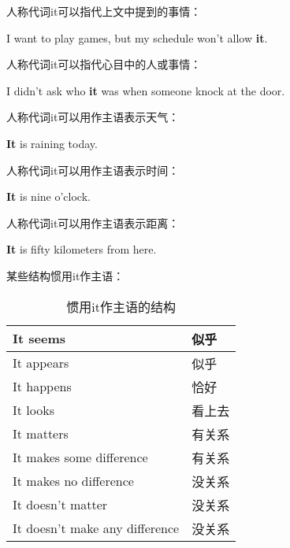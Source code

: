 \documentclass[UTF8]{ctexart}
\begin{document}
    人称代词{\hspace{3pt}\ttfamily it}可以指代上文中提到的事情：
    \begin{center}
        \ttfamily\large
        I want to play games, but my schedule won't allow \textbf{it}.\\[6mm]
    \end{center}
    人称代词{\hspace{3pt}\ttfamily it}可以指代心目中的人或事情：
    \begin{center}
        \ttfamily\large
        I didn't ask who \textbf{it} was when someone knock at the door.\\[6mm]
    \end{center}
    人称代词{\hspace{3pt}\ttfamily it}可以用作主语表示天气：
    \begin{center}
        \ttfamily\large
        \textbf{It} is raining today.\\[4mm]
    \end{center}
    人称代词{\hspace{3pt}\ttfamily it}可以用作主语表示时间：
    \begin{center}
        \ttfamily\large
        \textbf{It} is nine o'clock.\\[4mm]
    \end{center}
    人称代词{\hspace{3pt}\ttfamily it}可以用作主语表示距离：
    \begin{center}
        \ttfamily\large
        \textbf{It} is fifty kilometers from here.\\[4mm]
    \end{center}
    某些结构惯用{\hspace{3pt}\ttfamily it}作主语：\vspace{5pt}
    \begin{table}[h]
        \begin{center}
            \ttfamily
            \begin{tabular}{p{190pt}|p{60pt}}
                \hline
                It seems&似乎\\ \hline
                It appears&似乎\\ \hline
                It happens&恰好\\ \hline
                It looks&看上去\\ \hline
                It matters&有关系\\ \hline
                It makes some difference&有关系\\ \hline
                It makes no difference&没关系\\ \hline
                It doesn't matter&没关系\\ \hline
                It doesn't make any difference&没关系\\ \hline
            \end{tabular}
            \rmfamily
            \caption{惯用{\hspace{3pt}\ttfamily it}作主语的结构}
        \end{center}
    \end{table}\\
\end{document}
